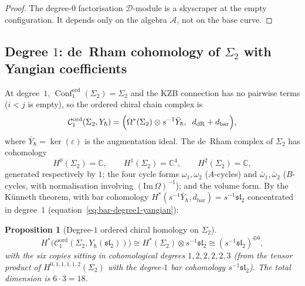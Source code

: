 \documentclass[11pt,reqno]{amsart}
\newtheorem{proposition}[theorem]{Proposition}
\theoremstyle{definition}
\theoremstyle{remark}
\newcommand{\cA}{\mathcal{A}}
\newcommand{\cC}{\mathcal{C}}
\newcommand{\cD}{\mathcal{D}}
\DeclareMathOperator{\Conf}{Conf}
\newcommand{\CC}{\mathbb{C}}
\numberwithin{equation}{section}
\begin{document}
\begin{proof}
The degree-$0$ factorisation $\cD$-module is a skyscraper
at the empty configuration. It depends only on the algebra
$\cA$, not on the base curve.
\end{proof}

\subsection{Degree $1$: de~Rham cohomology of
$\Sigma_2$ with Yangian coefficients}
\label{subsec:g2-degree1}

At degree~$1$,
$\Conf_1^{\mathrm{ord}}(\Sigma_2) = \Sigma_2$ and the KZB
connection has no pairwise terms ($i < j$ is empty), so the
ordered chiral chain complex is
\begin{equation}\label{eq:g2-degree1-cx}
  \cC_1^{\mathrm{ord}}(\Sigma_2, Y_\hbar)
  = \Bigl(\Omega^*(\Sigma_2) \otimes s^{-1}\bar{Y}_\hbar,
  \;\; d_{\mathrm{dR}} + d_{\mathrm{bar}}\Bigr),
\end{equation}
where $\bar{Y}_\hbar = \ker(\varepsilon)$ is the
augmentation ideal.
The de~Rham complex of $\Sigma_2$ has cohomology
\begin{equation}\label{eq:dr-sigma2}
  H^0(\Sigma_2) = \CC, \qquad
  H^1(\Sigma_2) = \CC^4, \qquad
  H^2(\Sigma_2) = \CC,
\end{equation}
generated respectively by $1$; the four cycle forms
$\omega_1, \omega_2$ ($A$-cycles) and
$\bar{\omega}_1, \bar{\omega}_2$ ($B$-cycles, with
normalisation involving
$(\mathrm{Im}\,\Omega)^{-1}$); and the volume form.
By the K\"unneth theorem, with bar cohomology
$H^*(s^{-1}\bar{Y}_\hbar, d_{\mathrm{bar}}) =
s^{-1}\mathfrak{sl}_2$ concentrated in degree~$1$
(equation~\eqref{eq:bar-degree1-yangian}):

\begin{proposition}[Degree-$1$ ordered chiral homology on
$\Sigma_2$]
\label{prop:g2-degree1}
\begin{equation}\label{eq:g2-degree1-result}
  H^*\bigl(\cC_1^{\mathrm{ord}}(\Sigma_2,
  Y_\hbar(\mathfrak{sl}_2))\bigr)
  \cong H^*(\Sigma_2) \otimes s^{-1}\mathfrak{sl}_2
  \cong (s^{-1}\mathfrak{sl}_2)^{\oplus 6},
\end{equation}
with the six copies sitting in cohomological degrees
$1, 2, 2, 2, 2, 3$ \textup{(}from the tensor product of
$H^{0,1,1,1,1,2}(\Sigma_2)$ with the degree-$1$ bar
cohomology $s^{-1}\mathfrak{sl}_2$\textup{)}.
The total dimension is $6 \cdot 3 = 18$.
\end{proposition}
\end{document}
